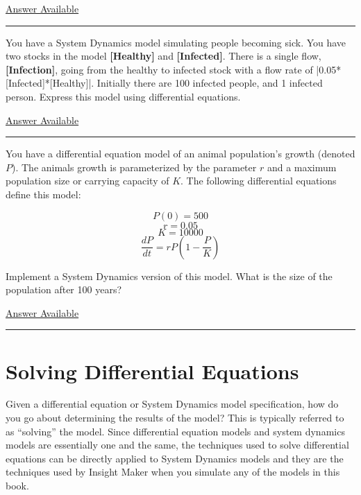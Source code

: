 \documentclass[]{memoir}
\newcommand{\FloatTok}[1]{\textcolor[rgb]{0.25,0.63,0.44}{{#1}}}
\newcommand{\NormalTok}[1]{{#1}}
\newcommand{\p}[1]{\textbf{{[}#1{]}}}
\begin{document}
\hyperref[Ans-10-1]{Answer Available}

\begin{center}\rule{3in}{0.4pt}\end{center}


You have a System Dynamics model simulating people becoming sick. You
have two stocks in the model \p{Healthy} and \p{Infected}. There is a
single flow, \p{Infection}, going from the healthy to infected stock
with a flow rate of |\FloatTok{0.05}\NormalTok{*[Infected]*[Healthy]}|.
Initially there are 100 infected people, and 1 infected person. Express
this model using differential equations.

\hyperref[Ans-10-2]{Answer Available}

\begin{center}\rule{3in}{0.4pt}\end{center}


You have a differential equation model of an animal population's growth
(denoted $P$). The animals growth is parameterized by the parameter $r$
and a maximum population size or carrying capacity of $K$. The following
differential equations define this model:

\[P(0) = 500\] \[r = 0.05\] \[K = 10000\]
\[\frac{dP}{dt}=r P \left(1-\frac{P}{K}\right)\]

Implement a System Dynamics version of this model. What is the size of
the population after 100 years?

\hyperref[Ans-10-3]{Answer Available}

\begin{center}\rule{3in}{0.4pt}\end{center}

\section{Solving Differential Equations}

Given a differential equation or System Dynamics model specification,
how do you go about determining the results of the model? This is
typically referred to as ``solving'' the model. Since differential
equation models and system dynamics models are essentially one and the
same, the techniques used to solve differential equations can be
directly applied to System Dynamics models and they are the techniques
used by Insight Maker when you simulate any of the models in this book.
\end{document}
